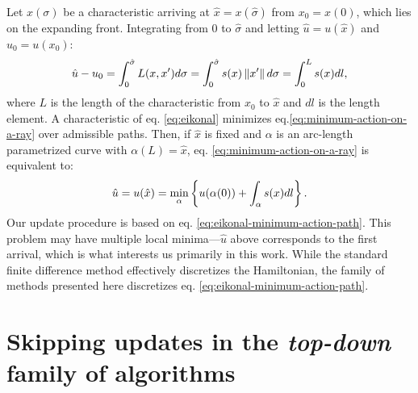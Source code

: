 \documentclass[smallcondensed]{svjour3}
\begin{document}
Let $x(\sigma)$ be a characteristic arriving at
$\hat{x} = x(\hat\sigma)$ from $x_0 = x(0)$, which lies on the
expanding front. Integrating from $0$ to $\hat\sigma$ and letting
$\hat u = u(\hat x)$ and $u_0 = u(x_0)$:
\begin{equation}
  \label{eq:minimum-action-on-a-ray}
  \hat u - u_0 = \int_{0}^{\hat\sigma} L(x, x') d\sigma = \int_{0}^{\hat\sigma} s(x) \left\|x'\right\| d\sigma = \int_0^L s(x) dl,
\end{equation}
where $L$ is the length of the characteristic from $x_0$ to $\hat{x}$
and $dl$ is the length element. A characteristic of eq.\@
\ref{eq:eikonal} minimizes eq.\@ \ref{eq:minimum-action-on-a-ray}
over admissible paths. Then, if $\hat{x}$ is fixed and $\alpha$ is an
arc-length parametrized curve with $\alpha(L) = \hat{x}$, eq.\@
\ref{eq:minimum-action-on-a-ray} is equivalent to:
\begin{equation}\label{eq:eikonal-minimum-action-path}
  \hat{u} = u(\hat{x}) = \min_\alpha \left\{u(\alpha(0)) + \int_\alpha s(x) dl\right\}.
\end{equation}
Our update procedure is based on eq.\@
\ref{eq:eikonal-minimum-action-path}. This problem may have multiple
local minima---$\hat{u}$ above corresponds to the first arrival, which
is what interests us primarily in this work. While the standard finite
difference method effectively discretizes the Hamiltonian, the family
of methods presented here discretizes eq.\@
\ref{eq:eikonal-minimum-action-path}.

\section{Skipping updates in the \emph{top-down} family of
  algorithms}\label{sec:kkt-skipping}
\end{document}
